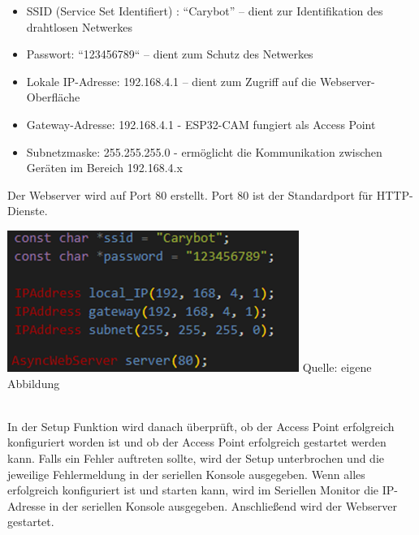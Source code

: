 \documentclass[ngerman,12pt,a4paper]{article}
\begin{document}
	\begin{itemize}
		\item SSID (Service Set Identifiert) : “Carybot” – dient zur Identifikation des drahtlosen Netwerkes
		\item Passwort: “123456789“ – dient zum Schutz des Netwerkes
		\item Lokale IP-Adresse: 192.168.4.1 – dient zum Zugriff auf die Webserver-Oberfläche
		\item Gateway-Adresse: 192.168.4.1 - ESP32-CAM fungiert als Access Point
		\item Subnetzmaske: 255.255.255.0 - ermöglicht die Kommunikation zwischen Geräten im Bereich 192.168.4.x
	\end{itemize} 
	Der Webserver wird auf Port 80 erstellt. Port 80 ist der Standardport für HTTP-Dienste. 
	\\[0.5cm]
	\begin{minipage}{\textwidth}
		\centering
		\includegraphics[scale=1]{Pictures/server-config}
		\label{fig:server-config}
		\vspace{-2pt}
		\small Quelle: eigene Abbildung
	\end{minipage} \\[0.75cm]
	In der Setup Funktion wird danach überprüft, ob der Access Point erfolgreich konfiguriert worden ist und ob der Access Point erfolgreich gestartet werden kann. Falls ein Fehler auftreten sollte, wird der Setup unterbrochen und die jeweilige Fehlermeldung in der seriellen Konsole ausgegeben. Wenn alles erfolgreich konfiguriert ist und starten kann, wird im Seriellen Monitor die IP-Adresse in der seriellen Konsole ausgegeben. Anschließend wird der Webserver gestartet. \\[0.5cm]
\end{document}
